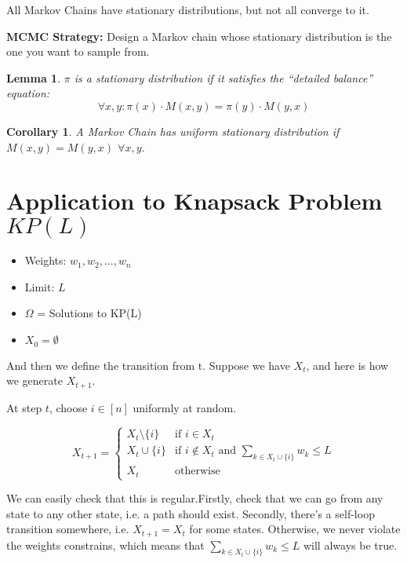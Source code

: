 \documentclass[twoside]{article}
\newtheorem{lemma}[theorem]{Lemma}
\newtheorem{corollary}[theorem]{Corollary}
\begin{document}
All Markov Chains have stationary distributions, but not all converge to it.

\textbf{MCMC Strategy:}  Design a Markov chain whose stationary distribution is the one you want to sample from.

\begin{lemma}
   $\pi$ is a stationary distribution if it satisfies the ``detailed balance'' equation:
   $$
   \forall x,y: \pi(x) \cdot M(x, y) = \pi(y) \cdot M(y, x)
   $$
\end{lemma}

\begin{corollary}
   A Markov Chain has uniform stationary distribution if $M(x, y) = M(y, x)$ $\forall x, y$.
\end{corollary}






\section{Application to Knapsack Problem $KP(L)$}

\begin{itemize}
   \item Weights: $w_1,w_2, ..., w_n$
   \item Limit: $L$
   \item $\Omega$ = Solutions to KP(L)
   \item $X_0 = \emptyset$
\end{itemize}

And then we define the transition from t. Suppose we have $X_t$, and here is how we generate $X_{t+1}$.  

At step $t$, choose $i \in [n]$ uniformly at random.

$$
X_{t+1} = \begin{cases}
   X_t \setminus \{i\} & \text{if } i \in X_t \\
   X_t \cup \{i\} & \text{if } i \notin X_t \text{ and } \sum_{k \in X_t \cup \{i\}} w_k \leq L\\
   X_t & \text{otherwise}
\end{cases}
$$

We can easily check that this is regular.Firstly, check that we can go from any state to any other state, i.e. a path should exist. Secondly, there's a self-loop transition somewhere, i.e. $X_{t+1}=X_t$ for some states. Otherwise, we never violate the weights constrains, which means that $\sum_{k \in X_t \cup \{i\}} w_k \leq L $ will always be true.
\end{document}
